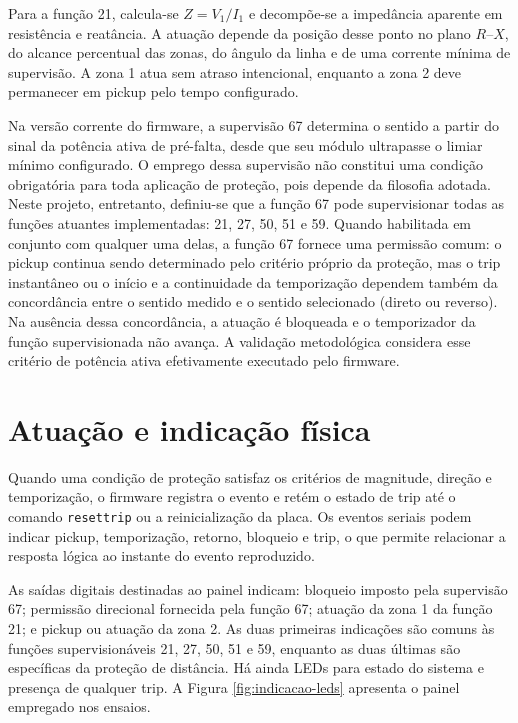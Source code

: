 Para a função 21, calcula-se $Z=V_1/I_1$ e decompõe-se a impedância aparente em resistência e reatância. A atuação depende da posição desse ponto no plano $R$--$X$, do alcance percentual das zonas, do ângulo da linha e de uma corrente mínima de supervisão. A zona 1 atua sem atraso intencional, enquanto a zona 2 deve permanecer em pickup pelo tempo configurado.

Na versão corrente do firmware, a supervisão 67 determina o sentido a partir do sinal da potência ativa de pré-falta, desde que seu módulo ultrapasse o limiar mínimo configurado. O emprego dessa supervisão não constitui uma condição obrigatória para toda aplicação de proteção, pois depende da filosofia adotada. Neste projeto, entretanto, definiu-se que a função 67 pode supervisionar todas as funções atuantes implementadas: 21, 27, 50, 51 e 59. Quando habilitada em conjunto com qualquer uma delas, a função 67 fornece uma permissão comum: o pickup continua sendo determinado pelo critério próprio da proteção, mas o trip instantâneo ou o início e a continuidade da temporização dependem também da concordância entre o sentido medido e o sentido selecionado (direto ou reverso). Na ausência dessa concordância, a atuação é bloqueada e o temporizador da função supervisionada não avança. A validação metodológica considera esse critério de potência ativa efetivamente executado pelo firmware.

\section{Atuação e indicação física}

Quando uma condição de proteção satisfaz os critérios de magnitude, direção e temporização, o firmware registra o evento e retém o estado de trip até o comando \texttt{resettrip} ou a reinicialização da placa. Os eventos seriais podem indicar pickup, temporização, retorno, bloqueio e trip, o que permite relacionar a resposta lógica ao instante do evento reproduzido.

As saídas digitais destinadas ao painel indicam: bloqueio imposto pela supervisão 67; permissão direcional fornecida pela função 67; atuação da zona 1 da função 21; e pickup ou atuação da zona 2. As duas primeiras indicações são comuns às funções supervisionáveis 21, 27, 50, 51 e 59, enquanto as duas últimas são específicas da proteção de distância. Há ainda LEDs para estado do sistema e presença de qualquer trip. A Figura \ref{fig:indicacao-leds} apresenta o painel empregado nos ensaios.

